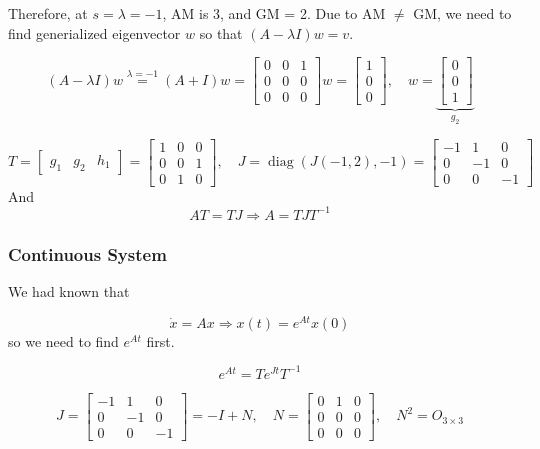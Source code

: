 \documentclass[12pt,a4paper]{article}
\begin{document}
 Therefore, at $s = \lambda = -1$, AM is 3, and GM = 2. Due to AM $\neq$ GM, we need to find generialized eigenvector $w$ so that $(A - \lambda I) w = v$.

\[
(A - \lambda I)w \overset{\lambda = -1}{=} (A + I)w = \begin{bmatrix}
	0 & 0 & 1 \\
	 0 & 0 & 0 \\
	 0 & 0 & 0 
\end{bmatrix} w = \begin{bmatrix}
1 \\ 0 \\ 0
\end{bmatrix}, \quad w = \underbrace{\begin{bmatrix}
0 \\ 0 \\ 1
\end{bmatrix}}_{g_2}
\]


\[
T = \begin{bmatrix}
	g_1 & g_2 & h_1
\end{bmatrix} = \begin{bmatrix}
1 & 0 & 0 \\
0 & 0 & 1 \\
0 & 1 & 0
\end{bmatrix}, \quad J = \operatorname{diag} (J(-1, 2), -1) = \begin{bmatrix}
-1 & 1 & 0\\
0 & -1 & 0 \\
0 & 0 & -1
\end{bmatrix}
\]
And
\[
AT = TJ\Rightarrow A = TJT^{-1}
\]


\subsubsection*{Continuous System}

We had known that

\[
\dot x = Ax \Rightarrow x(t) = e^{At} x(0)
\]
so we need to find $e^{At}$ first.

\[
e^{At} = Te^{Jt} T^{-1}
\]

\[
J = \begin{bmatrix}
	-1 & 1 & 0\\
	0 & -1 & 0 \\
	0 & 0 & -1
\end{bmatrix} = - I + N , \quad N = \begin{bmatrix}
0 & 1 & 0 \\
0 & 0 & 0 \\
0 & 0 & 0
\end{bmatrix} , \quad N^2 = O_{3\times3}
\]
\end{document}
